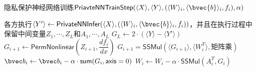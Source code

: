 %
\begin{algorithm}[h!]
\caption{隐私保护神经网络训练{$\mathsf{PriavteNNTrainStep}(\langle X \rangle, \langle Y \rangle, (\langle W \rangle_i, \langle \bvec{b} \rangle_i, f_i), \alpha)$}}
\label{alg:ss-perm:perm-act}
    \begin{algorithmic}[1]
    \State 各方执行$\langle Y' \rangle \gets \mathsf{PrivateNNInfer}(\langle X \rangle, (\langle W \rangle_i, \langle \bvec{b} \rangle_i, f_i))$，并且在执行过程中保留中间变量$Z_1, \cdots, Z_L$和$A_1, \cdots, A_L$
    \State $G_L \gets 2 \cdot (\langle Y \rangle - \langle Y' \rangle)$
     
        \State $G_{i + 1} \gets \mathsf{PermNonlinear}(Z_{i+1}, \dfrac{df_i}{dx})$ 
        \State $G_{i + 1} = \mathsf{SSMul}(\langle G_{i+1} \rangle, \langle W_i^T \rangle, \text{矩阵乘})$ 
        \State $\bvec b_i \gets \bvec b_i - \alpha \cdot \mathsf{sum}(G_i, \mathsf{axis}=0)$
        \State $W_i \gets W_i - \alpha \cdot \mathsf{SSMul}(A_i^T, G_i)$
    \EndFor
\end{algorithmic}
\end{algorithm}

%